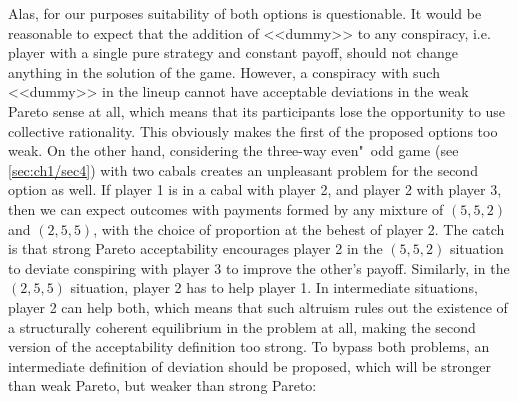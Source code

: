 Alas, for our purposes suitability of both options is questionable. It would be reasonable to expect that the addition of <<dummy>> to any conspiracy, i.e. player with a single pure strategy and constant payoff, should not change anything in the solution of the game. However, a conspiracy with such <<dummy>> in the lineup cannot have acceptable deviations in the weak Pareto sense at all, which means that its participants lose the opportunity to use collective rationality. This obviously makes the first of the proposed options too weak. On the other hand, considering the three-way even"~odd game (see \ref{sec:ch1/sec4}) with two cabals creates an unpleasant problem for the second option as well. If player 1 is in a cabal with player 2, and player 2 with player 3, then we can expect outcomes with payments formed by any mixture of $(5, 5, 2)$ and $(2, 5, 5)$, with the choice of proportion at the behest of player 2. The catch is that strong Pareto acceptability encourages player 2 in the $(5,5,2)$ situation to deviate conspiring with player 3 to improve the other's payoff. Similarly, in the $(2,5,5)$ situation, player 2 has to help player 1. In intermediate situations, player 2 can help both, which means that such altruism rules out the existence of a structurally coherent equilibrium in the problem at all, making the second version of the acceptability definition too strong. To bypass both problems, an intermediate definition of deviation should be proposed, which will be stronger than weak Pareto, but weaker than strong Pareto: %
